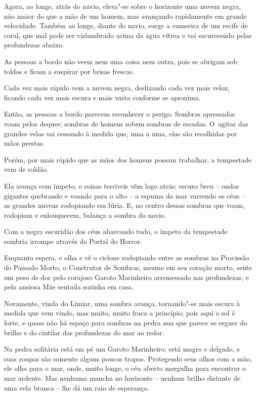 Agora, ao longe, atrás do navio, eleva"-se sobre o horizonte uma nuvem
negra, não maior do que a mão de um homem, mas avançando rapidamente em
grande velocidade. Também ao longe, diante do navio, surge a cumeeira de
um recife de coral, que mal pode ser vislumbrado acima da água vítrea e
vai escurecendo pelas profundezas abaixo.

As pessoas a bordo não veem nem uma coisa nem outra, pois se abrigam sob
toldos e ficam a suspirar por brisas frescas.

Cada vez mais rápido vem a nuvem negra, deslizando cada vez mais veloz,
ficando cada vez mais escura e mais vasta conforme se aproxima.

Então, as pessoas a bordo parecem reconhecer o perigo. Sombras
apressadas voam pelos deques; sombras de homens sobem sombras de
escadas. O~agitar das grandes velas vai cessando à medida que, uma a
uma, elas são recolhidas por mãos prestas.

Porém, por mais rápido que as mãos dos homens possam trabalhar, a tempestade
vem de roldão.

Ela avança com ímpeto, e coisas terríveis vêm logo atrás; escuro breu --
ondas gigantes quebrando e voando para o alto -- a espuma do mar
varrendo os céus -- as grandes nuvens rodopiando em fúria. E, no centro
dessas sombras que voam, rodopiam e enlouquecem, balança a sombra do
navio.

Com a negra escuridão dos céus abarcando tudo, o ímpeto da tempestade
sombria irrompe através do Portal do Horror.

Enquanto espera, e olha e vê o ciclone rodopiando entre as sombras na
Procissão do Passado Morto, o Construtor de Sombras, mesmo em seu
coração morto, sente um peso de dor pelo corajoso Garoto Marinheiro
arremessado nas profundezas, e pela ansiosa Mãe sentada sozinha em casa.

\smallskip
Novamente, vinda do Limiar, uma sombra avança, tornando"-se mais escura à
medida que vem vindo, mas muito, muito fraca a princípio; pois aqui o
sol é forte, e quase não há espaço para sombras na pedra nua que parece
se erguer do brilho e do cintilar das profundezas do mar ao redor.

Na pedra solitária está em pé um Garoto Marinheiro; está magro e
delgado, e suas roupas são somente alguns poucos trapos. Protegendo seus
olhos com a mão, ele olha para o mar, onde, muito longe, o céu aberto
mergulha para encontrar o mar ardente. Mas nenhuma mancha no horizonte
-- nenhum brilho distante de uma vela branca -- lhe dá um raio de
esperança.


